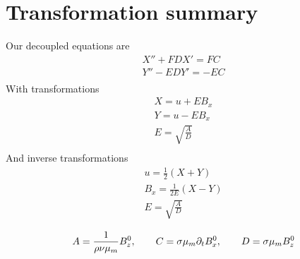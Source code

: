 \documentclass[11pt]{article}
\begin{document}
\section{Transformation summary}
Our decoupled equations are
\begin{equation}\begin{aligned}
X'' + F D X' = FC \\
Y'' - E D Y' = - EC \\
\end{aligned} \end{equation}
With transformations
\begin{equation}\begin{aligned}
X = u + E B_x \\
Y = u - E B_x \\
E = \sqrt{\frac{A}{D}} \\
\end{aligned} \end{equation}
And inverse transformations
\begin{equation}\begin{aligned}
u   = \frac{1}{2} \left( X + Y \right) \\
B_x = \frac{1}{2E} \left( X - Y \right) \\
E = \sqrt{\frac{A}{D}} \\
\end{aligned} \end{equation}
\begin{equation}\begin{aligned}
A = \frac{1}{\rho \nu {\mu_m}} B_z^0, \qquad
C = \sigma {\mu_m} \partial_t B_x^0, \qquad
D = \sigma {\mu_m} B_z^0
\end{aligned} \end{equation}
\end{document}
